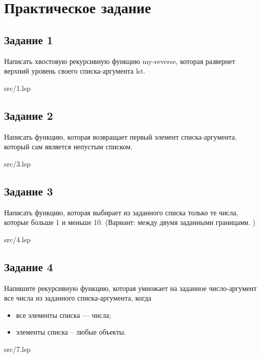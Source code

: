 \chapter*{Практическое задание}

\section*{Задание 1}
Написать хвостовую рекурсивную функцию my-reverse, которая развернет верхний
уровень своего списка-аргумента lst.

\FloatBarrier
\begin{lstinputlisting}[style={lsp}]{src/1.lsp}
\end{lstinputlisting}
\FloatBarrier

\section*{Задание 2}
Написать функцию, которая возвращает первый элемент списка-аргумента, который сам
является непустым списком.

\FloatBarrier
\begin{lstinputlisting}[style={lsp}]{src/3.lsp}
\end{lstinputlisting}
\FloatBarrier

\section*{Задание 3}
Написать функцию, которая выбирает из заданного списка только те числа, которые
больше 1 и меньше 10. (Вариант: между двумя заданными границами. )

\FloatBarrier
\begin{lstinputlisting}[style={lsp}]{src/4.lsp}
\end{lstinputlisting}
\FloatBarrier


\section*{Задание 4}
Напишите рекурсивную функцию, которая умножает на заданное число-аргумент все числа
из заданного списка-аргумента, когда

\begin{itemize}
	\item все элементы списка --- числа;
	\item элементы списка -- любые объекты.
\end{itemize}

\FloatBarrier
\begin{lstinputlisting}[style={lsp}]{src/7.lsp}
\end{lstinputlisting}
\FloatBarrier

